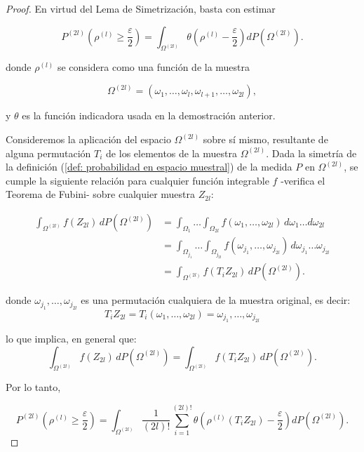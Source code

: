 \documentclass{report}
\begin{document}
\begin{proof}
 
En virtud del Lema de Simetrización, basta con estimar  
    
\[
P^{(2l)}\left( \rho^{(l)} \geq \frac{\varepsilon}{2} \right) = \int_{\Omega^{(2l)}} \theta \left( \rho^{(l)} - \frac{\varepsilon}{2} \right) dP(\Omega^{(2l)}).
\]

donde \( \rho^{(l)} \) se considera como una función de la muestra  

\[
\Omega^{(2l)} = (\omega_1, \dots, \omega_l, \omega_{l+1}, \dots, \omega_{2l}),
\]

y $\theta$ es la función indicadora usada en la demostración anterior.\newline

Consideremos la aplicación del espacio \( \Omega^{(2l)} \) sobre sí mismo, resultante de alguna permutación \( T_i \) de los elementos de la muestra \( \Omega^{(2l)} \). Dada la simetría 
de la definición (\ref{def: probabilidad en espacio muestral}) de la medida \( P \) en \( \Omega^{(2l)} \), se cumple la siguiente relación para cualquier función integrable \( f \)
-verifica el Teorema de Fubini- sobre cualquier muestra $Z_{2l}$:

\begin{equation*}
    \begin{split}
            \int_{\Omega^{(2l)}} f(Z_{2l}) \, dP(\Omega^{(2l)}) &= \int_{\Omega_1} \ldots \int_{\Omega_{2l}} f(\omega_1,\ldots,\omega_{2l})  \, d\omega_1\ldots d\omega_{2l} \\
                &= \int_{\Omega_{j_1}}\ldots\int_{\Omega_{j_{2l}}} f(\omega_{j_1},\ldots,\omega_{j_{2l}}) \, d\omega_{j_1}\ldots \omega_{j_{2l}}\\
                &= \int_{\Omega^{(2l)}} f(T_i Z_{2l}) \, dP(\Omega^{(2l)}).
    \end{split}
\end{equation*}

donde $\omega_{j_1},\ldots,\omega_{j_{2l}}$ es una permutación cualquiera de la muestra original, es decir:
\[
T_i Z_{2l} = T_i (\omega_1,\ldots,\omega_{2l}) = \omega_{j_1},\ldots,\omega_{j_{2l}}
\]

lo que implica, en general que:
\[
\int_{\Omega^{(2l)}} f(Z_{2l}) \, dP(\Omega^{(2l)}) = \int_{\Omega^{(2l)}} f(T_i Z_{2l}) \, dP(\Omega^{(2l)}).
\]

Por lo tanto,

\begin{equation}\label{eq:probabilidad integral con permutaciones}
P^{(2l)}\left( \rho^{(l)} \geq \frac{\varepsilon}{2} \right) = \int_{\Omega^{(2l)}} \frac{1}{(2l)!} \sum_{i=1}^{(2l)!} \theta \left( \rho^{(l)}(T_i Z_{2l}) - \frac{\varepsilon}{2}  \right) dP(\Omega^{(2l)}).
\end{equation}


\end{proof}
\end{document}
